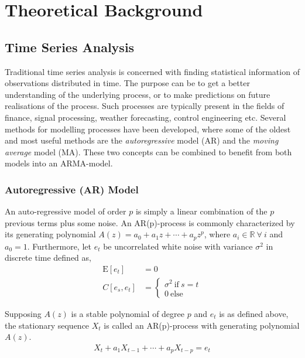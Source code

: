 \chapter{Theoretical Background}

\section{Time Series Analysis}

Traditional time series analysis is concerned with finding statistical information of observations distributed in time. The purpose can be to get a better understanding of the underlying process, or to make predictions on future realisations of the process. Such processes are typically present in the fields of finance, signal processing, weather forecasting, control engineering etc. Several methods for modelling processes have been developed, where some of the oldest and most useful methods are the \textit{autoregressive} model (AR) and the \textit{moving average} model (MA). These two concepts can be combined to benefit from both models into an ARMA-model.

\subsection{Autoregressive (AR) Model} \label{sub:ar}
An auto-regressive model of order $p$ is simply a linear combination of the $p$ previous terms plus some noise. An AR(p)-process is commonly characterized by its generating polynomial $A(z) = a_0 + a_1z + \cdots + a_pz^p$, where $a_i \in \mathbb{R} \ \forall \ i$ and $a_0=1$. Furthermore, let $e_t$ be uncorrelated white noise with variance $\sigma^2$ in discrete time defined as, 
\begin{align}
    \text{E}[e_t] &= 0 \label{eq:wne}\\
    C[e_s, e_t] &= \begin{cases}
    \sigma^2 \ \text{if} \ s=t \\
    0 \ \text{else}
    \end{cases} \label{eq:wnc}
\end{align}

Supposing $A(z)$ is a stable polynomial of degree $p$ and $e_t$ is as defined above, the stationary sequence $X_t$ is called an AR(p)-process with generating polynomial $A(z)$. 
\begin{align}
    X_t + a_1 X_{t-1} + \cdots + a_p X_{t-p} = e_t
    \label{eq:ar}
\end{align}


